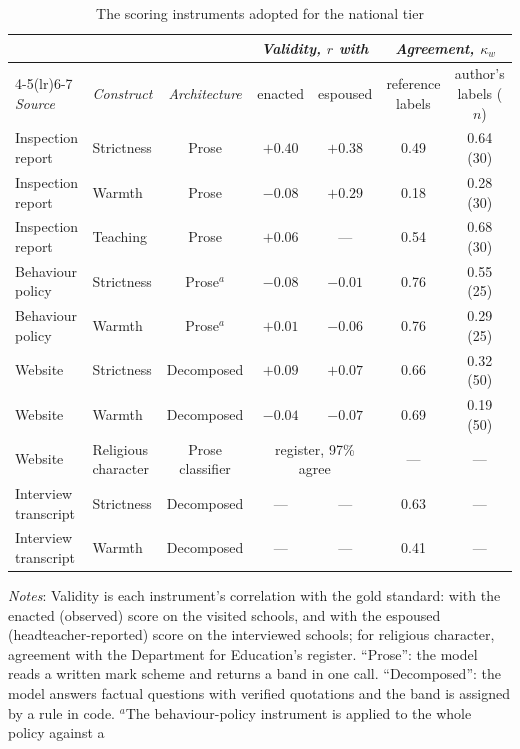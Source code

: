 \begin{table}[htbp]
\centering
\caption{The scoring instruments adopted for the national tier}
\label{tab:instruments_adopted}
\small
\begin{tabular}{llccccc}
\toprule
 & & & \multicolumn{2}{c}{\textit{Validity, $r$ with}} & \multicolumn{2}{c}{\textit{Agreement, $\kappa_w$}} \\
\cmidrule(lr){4-5}\cmidrule(lr){6-7}
\textit{Source} & \textit{Construct} & \textit{Architecture} &
enacted & espoused & reference labels & author's labels ($n$) \\
\midrule
Inspection report & Strictness & Prose & $+0.40$ & $+0.38$ & 0.49 & 0.64 (30) \\
Inspection report & Warmth & Prose & $-0.08$ & $+0.29$ & 0.18 & 0.28 (30) \\
Inspection report & Teaching & Prose & $+0.06$ & --- & 0.54 & 0.68 (30) \\
\addlinespace[3pt]
Behaviour policy & Strictness & Prose$^{a}$ & $-0.08$ & $-0.01$ & 0.76 & 0.55 (25) \\
Behaviour policy & Warmth & Prose$^{a}$ & $+0.01$ & $-0.06$ & 0.76 & 0.29 (25) \\
\addlinespace[3pt]
Website & Strictness & Decomposed & $+0.09$ & $+0.07$ & 0.66 & 0.32 (50) \\
Website & Warmth & Decomposed & $-0.04$ & $-0.07$ & 0.69 & 0.19 (50) \\
Website & Religious character & Prose classifier & \multicolumn{2}{c}{register, 97\% agree} & --- & --- \\
\addlinespace[3pt]
Interview transcript & Strictness & Decomposed & --- & --- & 0.63 & --- \\
Interview transcript & Warmth & Decomposed & --- & --- & 0.41 & --- \\
\bottomrule
\end{tabular}
\begin{minipage}{0.92\linewidth}
\vspace{4pt}\scriptsize
\textit{Notes}: Validity is each instrument's correlation with the gold standard: with the enacted (observed) score on the visited schools, and with the espoused (headteacher-reported) score on the interviewed schools; for religious character, agreement with the Department for Education's register. ``Prose'': the model reads a written mark scheme and
returns a band in one call. ``Decomposed'': the model answers factual
questions with verified quotations and the band is assigned by a rule in
code. $^{a}$The behaviour-policy instrument is applied to the whole policy against a

\end{minipage}
\end{table}
